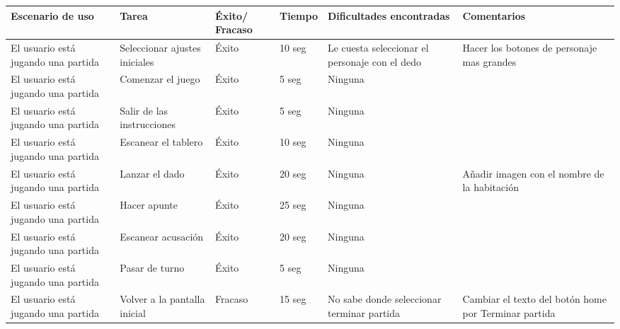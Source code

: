 \begin{table}[!h]
  \begin{center}
    \begin{tabular}{|p{2.2cm}|p{1.9cm}|p{1.4cm}|p{1.2cm}|p{3.1cm}|p{3.1cm}|}

      \hline
        \rowcolor{Gray} \textbf{Escenario de uso}
        & \textbf{Tarea}
        & \textbf{Éxito/ Fracaso}
        & \textbf{Tiempo}
        & \textbf{Dificultades encontradas}
        & \textbf{Comentarios}\\

      \hline
      El usuario está jugando una partida
      & Seleccionar ajustes iniciales
      & Éxito
      & 10 seg
      & Le cuesta seleccionar el personaje con el dedo
      & Hacer los botones de personaje mas grandes\\

      \hline
      El usuario está jugando una partida
      & Comenzar el juego
      & Éxito
      & 5 seg
      & Ninguna
      &\\

      \hline
      El usuario está jugando una partida
      & Salir de las instrucciones
      & Éxito
      & 5 seg
      & Ninguna
      &\\

      \hline
      El usuario está jugando una partida
      & Escanear el tablero
      & Éxito
      & 10 seg
      & Ninguna
      &\\

      \hline
      El usuario está jugando una partida
      & Lanzar el dado
      & Éxito
      & 20 seg
      & Ninguna
      & Añadir imagen con el nombre de la habitación\\

      \hline
      El usuario está jugando una partida
      & Hacer apunte
      & Éxito
      & 25 seg
      & Ninguna
      &\\

      \hline
      El usuario está jugando una partida
      & Escanear acusación
      & Éxito
      & 20 seg
      & Ninguna
      &\\

      \hline
      El usuario está jugando una partida
      & Pasar de turno
      & Éxito
      & 5 seg
      & Ninguna
      &\\

      \hline
      El usuario está jugando una partida
      & Volver a la pantalla inicial
      & Fracaso
      & 15 seg
      & No sabe donde seleccionar terminar partida
      & Cambiar el texto del botón home por Terminar partida\\


\end{tabular}
\end{center}
\end{table}
